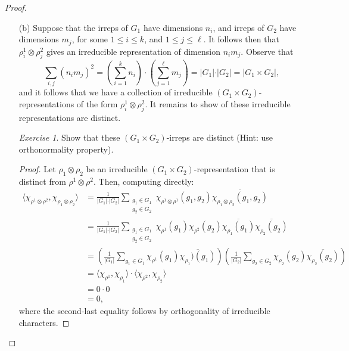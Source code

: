 \documentclass[a4paper]{report}
\theoremstyle{definition}
\theoremstyle{remark}
\theoremstyle{proposition}
\theoremstyle{conjecture}
\theoremstyle{lemma}
\theoremstyle{corollary}
\theoremstyle{exercise}
\newtheorem{exercise}{Exercise}
\theoremstyle{example}
\begin{document}
\begin{proof}
\begin{itemize}
        \item[(b)] 
            Suppose that the irreps of $G_1$ have dimensions $n_i$, and 
            irreps of $G_2$ have dimensions $m_j$, for some $1\leq i \leq k$,
            and $1\leq j \leq \ell$. It follows then that 
            $\rho_i^1\otimes \rho^2_j$ gives an irreducible representation of 
            dimension $n_im_j$. Observe that 
            $$\sum_{i,j} (n_im_j)^2 = \left(\sum_{i=1}^k n_i\right)\cdot \left(\sum_{j=1}^\ell m_j\right) = \vert G_1\vert \cdot \vert G_2\vert = \vert G_1\times G_2\vert,$$
            and it follows that we have a collection of irreducible 
            $(G_1\times G_2)$-representations of the form 
            $\rho^1_i\otimes \rho^2_j$. It remains to show of these 
            irreducible representations are distinct.
            \begin{exercise}
                Show that these $(G_1\times G_2)$-irreps are distinct
                (Hint: use orthonormality property).
            \end{exercise}
            \begin{proof}
                Let $\rho_1\otimes \rho_2$ be an irreducible 
                $(G_1\times G_2)$-representation that is distinct from 
                $\rho^1\otimes \rho^2$. Then, computing directly:
                \begin{align*}
                    \langle \chi_{\rho^1\otimes\rho^2},\chi_{\rho_1\otimes\rho_2}\rangle &= \frac{1}{\vert G_1\vert \cdot\vert G_2\vert} \sum_{\substack{g_1\in G_1\\g_2 \in G_2}} \chi_{\rho^1\otimes\rho^1}(g_1,g_2)\overline{\chi_{\rho_1\otimes \rho_2}(g_1,g_2)}\\
                                                                                         &=\frac{1}{\vert G_1\vert\cdot\vert G_2\vert} \sum_{\substack{g_1\in G_1\\g_2 \in G_2}} \chi_{\rho^1}(g_1) \chi_{\rho^2}(g_2) \overline{\chi_{\rho_1}(g_1)} \overline{\chi_{\rho_2}(g_2)}\\
                                                                                         &= \left(\frac{1}{\vert G_1\vert} \sum_{g_1\in G_1} \chi_{\rho^1}(g_1)\overline{\chi_{\rho_1})(g_1)}\right)\left(\frac{1}{\vert G_2\vert} \sum_{g_2\in G_2} \chi_{\rho_2}(g_2)\overline{\chi_{\rho_2}(g_2)}\right)\\
                                                                                         &= \langle \chi_{\rho^1},\chi_{\rho_1}\rangle \cdot \langle \chi_{\rho^2},\chi_{\rho_2}\rangle\\
                                                                                         &= 0\cdot 0 \\
                                                                                         &=0,
                \end{align*}
                where the second-last equality follows by orthogonality 
                of irreducible characters.
            \end{proof}
    \end{itemize}
\end{proof}
\end{document}
